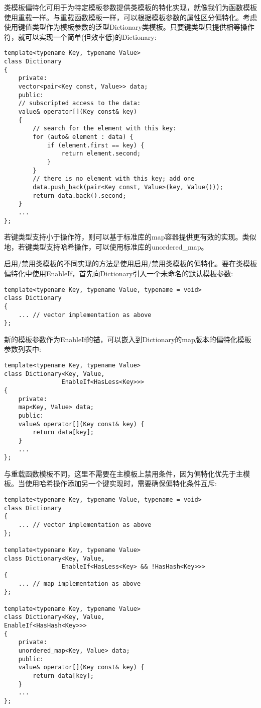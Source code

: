 
类模板偏特化可用于为特定模板参数提供类模板的特化实现，就像我们为函数模板使用重载一样。与重载函数模板一样，可以根据模板参数的属性区分偏特化。考虑使用键值类型作为模板参数的泛型Dictionary类模板。只要键类型只提供相等操作符，就可以实现一个简单(但效率低)的Dictionary:

\begin{lstlisting}[style=styleCXX]
template<typename Key, typename Value>
class Dictionary
{
	private:
	vector<pair<Key const, Value>> data;
	public:
	// subscripted access to the data:
	value& operator[](Key const& key)
	{
		// search for the element with this key:
		for (auto& element : data) {
			if (element.first == key) {
				return element.second;
			}
		}
		// there is no element with this key; add one
		data.push_back(pair<Key const, Value>(key, Value()));
		return data.back().second;
	}
	...
};
\end{lstlisting}

若键类型支持小于操作符，则可以基于标准库的map容器提供更有效的实现。类似地，若键类型支持哈希操作，可以使用标准库的unordered\_map。


启用/禁用类模板的不同实现的方法是使用启用/禁用类模板的偏特化。要在类模板偏特化中使用EnableIf，首先向Dictionary引入一个未命名的默认模板参数:

\begin{lstlisting}[style=styleCXX]
template<typename Key, typename Value, typename = void>
class Dictionary
{
	... // vector implementation as above
};
\end{lstlisting}

新的模板参数作为EnableIf的锚，可以嵌入到Dictionary的map版本的偏特化模板参数列表中:

\begin{lstlisting}[style=styleCXX]
template<typename Key, typename Value>
class Dictionary<Key, Value,
				EnableIf<HasLess<Key>>>
{
	private:
	map<Key, Value> data;
	public:
	value& operator[](Key const& key) {
		return data[key];
	}
	...
};
\end{lstlisting}

与重载函数模板不同，这里不需要在主模板上禁用条件，因为偏特化优先于主模板。当使用哈希操作添加另一个键实现时，需要确保偏特化条件互斥:

\begin{lstlisting}[style=styleCXX]
template<typename Key, typename Value, typename = void>
class Dictionary
{
	... // vector implementation as above
};

template<typename Key, typename Value>
class Dictionary<Key, Value,
				EnableIf<HasLess<Key> && !HasHash<Key>>> 
{
	... // map implementation as above
};

template<typename Key, typename Value>
class Dictionary<Key, Value,
EnableIf<HasHash<Key>>>
{
	private:
	unordered_map<Key, Value> data;
	public:
	value& operator[](Key const& key) {
		return data[key];
	}
	...
};
\end{lstlisting}

